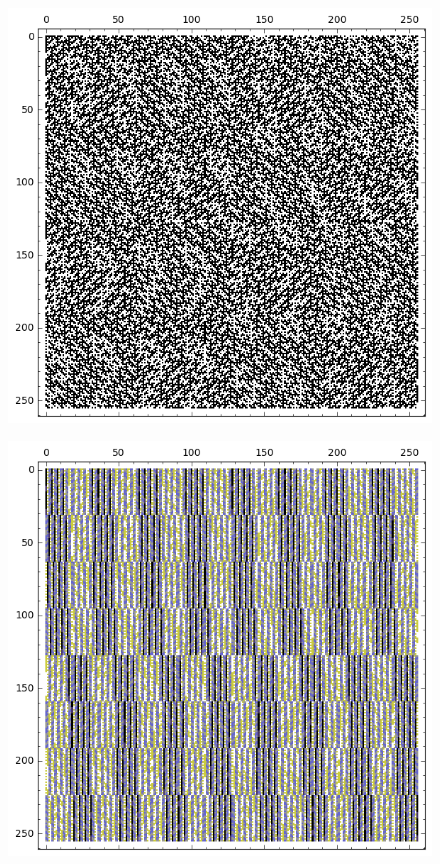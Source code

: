 \documentclass[12pt,a4paper]{article}
\begin{document}
\begin{figure}[!bhpt] %
\centering
\begin{minipage}{.48\textwidth}
  \centering
  \includegraphics[width=.9\linewidth]{../matrix_plot/re8_3_weight_class_matrix.png}
  \label{fig:8_3_weight_class_matrix}
\end{minipage}%
\begin{minipage}{.48\textwidth}
  \centering
  \includegraphics[width=.9\linewidth]{../matrix_plot/re8_3_bent_cayley_graph_index_matrix.png}
  \label{fig:8_3_bent_cayley_graph_index_matrix}
\end{minipage}
\end{figure}
~
%
\end{document}
